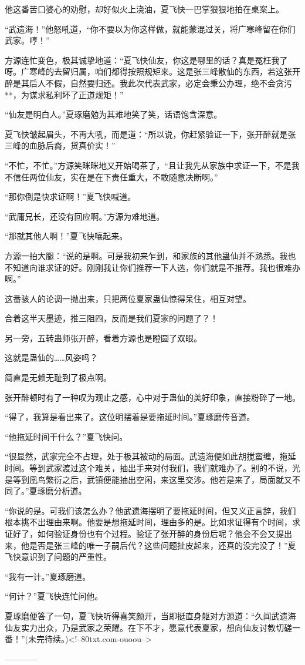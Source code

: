 \begin{this_body}
他这番苦口婆心的劝慰，却好似火上浇油，夏飞快一巴掌狠狠地拍在桌案上。

“武遗海！”他怒吼道，“你不要以为你这样做，就能蒙混过关，将广寒峰留在你们武家。哼！”

方源连忙变色，极其诚挚地道：“夏飞快仙友，你这是哪里的话？真是冤枉我了呀。广寒峰的去留归属，咱们都得按照规矩来。这是张三峰散仙的东西，若这张开醉是其后人不假，自然要归还。我此次代表武家，必定会秉公办理，绝不会贪污**，为谋求私利坏了正道规矩！”

“仙友是明白人。”夏琢磨勉为其难地笑了笑，话语饱含深意。

夏飞快皱起眉头，不再大吼，而是道：“所以说，你赶紧验证一下，张开醉就是张三峰的血脉后裔，货真价实！”

“不忙，不忙。”方源笑眯眯地又开始喝茶了，“且让我先从家族中求证一下，不是我不信任两位仙友，实在是在下责任重大，不敢随意决断啊。”

“那你倒是快求证啊！”夏飞快喊道。

“武庸兄长，还没有回应啊。”方源为难地道。

“那就其他人啊！”夏飞快嚷起来。

方源一拍大腿：“说的是啊。可是我初来乍到，和家族的其他蛊仙并不熟悉。我也不知道向谁求证的好。刚刚我让你们推荐一下人选，你们就是不推荐。我也很难办啊。”

这番骇人的论调一抛出来，只把两位夏家蛊仙惊得呆住，相互对望。

合着这半天墨迹，推三阻四，反而是我们夏家的问题了？！

另一旁，五转蛊师张开醉，看着方源也是瞪圆了双眼。

这就是蛊仙的……风姿吗？

简直是无赖无耻到了极点啊。

张开醉顿时有了一种叹为观止之感，心中对于蛊仙的美好印象，直接粉碎了一地。

“得了，我算是看出来了。这位明摆着是要拖延时间。”夏琢磨传音道。

“他拖延时间干什么？”夏飞快问。

“很显然，武家完全不占理，处于极其被动的局面。武遗海便如此胡搅蛮缠，拖延时间。等到武家渡过这个难关，抽出手来对付我们，我们就难办了。别的不说，光是等到凰鸟繁衍之后，武镇便能抽出空闲，来这里交涉。他若是来了，局面就又不同了。”夏琢磨分析道。

“你说的是。可我们该怎么办？他武遗海摆明了要拖延时间，但又义正言辞，我们根本挑不出理由来啊。他要是想拖延时间，理由多的是。比如求证得有个时间，求证好了，如何验证身份也有个过程。验证了张开醉的身份后呢？他会不会又提出来，他是否是张三峰的唯一子嗣后代？这些问题扯皮起来，还真的没完没了！”夏飞快意识到了问题的严重性。

“我有一计。”夏琢磨道。

“何计？”夏飞快连忙问他。

夏琢磨便答了一句，夏飞快听得喜笑颜开，当即挺直身躯对方源道：“久闻武遗海仙友实力出众，乃是武家之荣耀。在下不才，愿意代表夏家，想向仙友讨教切磋一番！”(未完待续。)<!--80txt.com-ouoou-->

------------

\end{this_body}

